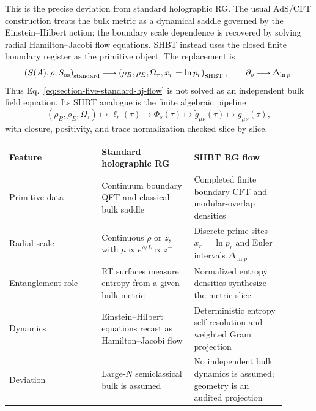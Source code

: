 \documentclass[11pt]{article}
\begin{document}
This is the precise deviation from standard holographic RG.  The usual
AdS/CFT construction treats the bulk metric as a dynamical saddle governed by
the Einstein--Hilbert action; the boundary scale dependence is recovered by
solving radial Hamilton--Jacobi flow equations.  SHBT instead uses the closed
finite boundary register as the primitive object.  The replacement is
\begin{equation}
\label{eq:section-five-standard-to-shbt-rg-replacement}
 \left(
 S(A),\rho,S_{\rm os}
 \right)_{\rm standard}
 \longrightarrow
 \left(
 \rho_B,\rho_E,\Omega_{\tau},x_r=\ln p_r
 \right)_{\rm SHBT},
 \qquad
 \partial_{\rho}
 \longrightarrow
 \Delta_{\ln p}.
\end{equation}
Thus Eq.~\eqref{eq:section-five-standard-hj-flow} is not solved as an
independent bulk field equation.  Its SHBT analogue is the finite algebraic
pipeline
\begin{equation}
\label{eq:section-five-shbt-rg-comparison-map}
 (\rho_B,\rho_E,\Omega_{\tau})
 \longmapsto
 \ell_r(\tau)
 \longmapsto
 \Phi_s(\tau)
 \longmapsto
 \widetilde g_{\mu\nu}(\tau)
 \longmapsto
 g_{\mu\nu}(\tau),
\end{equation}
with closure, positivity, and trace normalization checked slice by slice.

\begin{center}
\small
\begin{tabular}{@{}p{0.30\linewidth}p{0.30\linewidth}p{0.30\linewidth}@{}}
\toprule
Feature & Standard holographic RG & SHBT RG flow \\
\midrule
Primitive data & Continuum boundary QFT and classical bulk saddle &
Completed finite boundary CFT and modular-overlap densities \\
Radial scale & Continuous $\rho$ or $z$, with $\mu\propto e^{\rho/L}\propto z^{-1}$ &
Discrete prime sites $x_r=\ln p_r$ and Euler intervals $\Delta_{\ln p}$ \\
Entanglement role & RT surfaces measure entropy from a given bulk metric &
Normalized entropy densities synthesize the metric slice \\
Dynamics & Einstein--Hilbert equations recast as Hamilton--Jacobi flow &
Deterministic entropy self-resolution and weighted Gram projection \\
Deviation & Large-$N$ semiclassical bulk is assumed &
No independent bulk dynamics is assumed; geometry is an audited projection \\
\bottomrule
\end{tabular}
\end{center}
\end{document}
